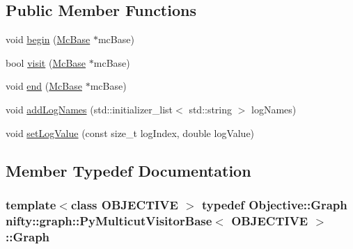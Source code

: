 \subsection*{Public Member Functions}
\begin{DoxyCompactItemize}
\item 
void \hyperlink{classnifty_1_1graph_1_1PyMulticutVisitorBase_a054c3512fcb6550eb0b43d734b31f783}{begin} (\hyperlink{classnifty_1_1graph_1_1PyMulticutVisitorBase_af330023bad773111484193ae8a7bed03}{Mc\+Base} $\ast$mc\+Base)
\item 
bool \hyperlink{classnifty_1_1graph_1_1PyMulticutVisitorBase_ad43e6aa19f3cc92a46e8f176a666395c}{visit} (\hyperlink{classnifty_1_1graph_1_1PyMulticutVisitorBase_af330023bad773111484193ae8a7bed03}{Mc\+Base} $\ast$mc\+Base)
\item 
void \hyperlink{classnifty_1_1graph_1_1PyMulticutVisitorBase_adf6641fe35a28dd068c33308ef209d14}{end} (\hyperlink{classnifty_1_1graph_1_1PyMulticutVisitorBase_af330023bad773111484193ae8a7bed03}{Mc\+Base} $\ast$mc\+Base)
\item 
void \hyperlink{classnifty_1_1graph_1_1PyMulticutVisitorBase_a29e7117920077215a6bdd97c6a8824a0}{add\+Log\+Names} (std\+::initializer\+\_\+list$<$ std\+::string $>$ log\+Names)
\item 
void \hyperlink{classnifty_1_1graph_1_1PyMulticutVisitorBase_ada6635b8dcb8a1b024a930807a6f25fa}{set\+Log\+Value} (const size\+\_\+t log\+Index, double log\+Value)
\end{DoxyCompactItemize}


\subsection{Member Typedef Documentation}
\hypertarget{classnifty_1_1graph_1_1PyMulticutVisitorBase_a95007ad5a13cf745ef3722beb0918891}{}
\subsubsection[{Graph}]{\setlength{\rightskip}{0pt plus 5cm}template$<$class O\+B\+J\+E\+C\+T\+I\+V\+E $>$ typedef Objective\+::\+Graph {\bf nifty\+::graph\+::\+Py\+Multicut\+Visitor\+Base}$<$ O\+B\+J\+E\+C\+T\+I\+V\+E $>$\+::{\bf Graph}}\label{classnifty_1_1graph_1_1PyMulticutVisitorBase_a95007ad5a13cf745ef3722beb0918891}
\hypertarget{classnifty_1_1graph_1_1PyMulticutVisitorBase_af330023bad773111484193ae8a7bed03}{}
